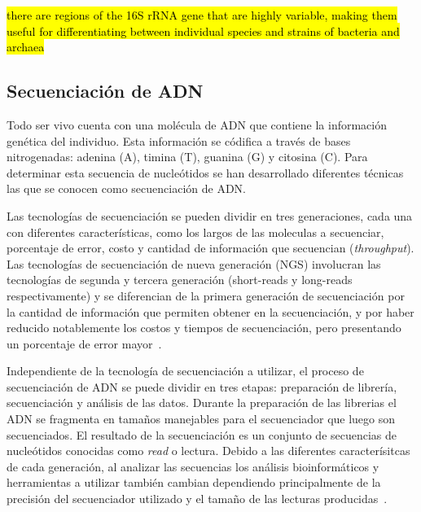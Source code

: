

\hl{ there are regions of the 16S rRNA gene that are highly variable, making them useful for differentiating between individual species and strains of bacteria and archaea}

\subsection{Secuenciación de ADN}
Todo ser vivo cuenta con una molécula de ADN que contiene la información genética del individuo. 
Esta información se códifica a través de bases nitrogenadas: adenina (A), timina (T), guanina (G) y citosina (C).%
Para determinar esta secuencia de nucleótidos se han desarrollado diferentes técnicas las que se conocen como secuenciación de ADN. 

Las tecnologías de secuenciación se pueden dividir en tres generaciones, cada una con diferentes características, como los largos de las moleculas a secuenciar, porcentaje de error, costo y cantidad de información que secuencian (\textit{throughput}).
Las tecnologías de secuenciación de nueva generación (NGS) involucran las tecnologías de segunda y tercera generación (short-reads y long-reads respectivamente) y se diferencian de la primera generación de secuenciación por la cantidad de información que permiten obtener en la secuenciación, y por haber reducido notablemente los costos y tiempos de secuenciación, pero presentando un porcentaje de error mayor~\cite{kumar2024next}. 

Independiente de la tecnología de secuenciación a utilizar, el proceso de secuenciación de ADN se puede dividir en tres etapas: preparación de librería, secuenciación y análisis de las datos. Durante la preparación de las librerias el ADN se fragmenta en tamaños manejables para el secuenciador que luego son secuenciados. El resultado de la secuenciación es un conjunto de secuencias de nucleótidos conocidas como \textit{read} o lectura.
Debido a las diferentes caracterísitcas de cada generación, al analizar las secuencias los análisis bioinformáticos y herramientas a utilizar también cambian dependiendo principalmente de la precisión del secuenciador utilizado y el tamaño de las lecturas producidas~\cite{bierman2014understanding}.

